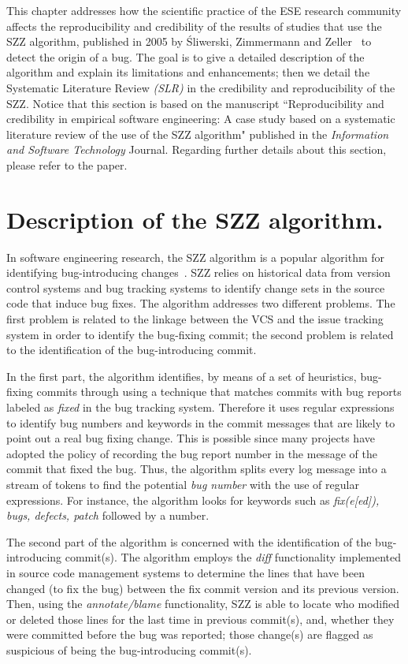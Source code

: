 \documentclass[a4paper, 12pt]{book}
\begin{document}
This chapter addresses how the scientific practice of the ESE research community affects the reproducibility and credibility of the results of studies that use the SZZ algorithm, published in 2005 by {\'S}liwerski, Zimmermann and Zeller~\cite{sliwerski2005changes}  to detect the origin of a bug. The goal is to give a detailed description of the algorithm and explain its limitations and enhancements; then we detail the Systematic Literature Review \emph{(SLR)} in the credibility and reproducibility of the SZZ. Notice that this section is based on the manuscript ``Reproducibility and credibility in empirical software engineering: A case study based on a systematic literature review of the use of the SZZ algorithm" published in the \emph{Information and Software Technology} Journal. Regarding further details about this section, please refer to the paper.


\section{Description of the SZZ algorithm.}
\label{subsec:SZZ algorithm}
In software engineering research, the SZZ algorithm is a popular algorithm for identifying bug-introducing changes~\cite{da2016framework}. SZZ relies on historical data from version control systems and bug tracking systems to identify change sets in the source code that induce bug fixes. The algorithm addresses two different problems. The first problem is related to the linkage between the VCS and the issue tracking system in order to identify the bug-fixing commit; the second problem is related to the identification of the bug-introducing commit.

In the first part, the algorithm identifies, by means of a set of heuristics, bug-fixing commits through using a technique that matches commits with bug reports labeled as \emph{fixed} in the bug tracking system. Therefore it uses regular expressions to identify bug numbers and keywords in the commit messages that are likely to point out a real bug fixing change. This is possible since many projects have adopted the policy of recording the bug report number in the message of the commit that fixed the bug. Thus, the algorithm splits every log message into a stream of tokens to find the potential \emph{bug number} with the use of regular expressions. For instance, the algorithm looks for keywords such as \emph{fix(e[ed]), bugs, defects, patch} followed by a number.

The second part of the algorithm is concerned with the identification of the bug-introducing commit(s). The algorithm employs the \textit{diff} functionality implemented in source code management systems to determine the lines that have been changed (to fix the bug) between the fix commit version and its previous version. Then, using the \textit{annotate/blame} functionality, SZZ is able to locate who modified or deleted those lines for the last time in previous commit(s), and, whether they were committed before the bug was reported; those change(s) are flagged as suspicious of being the bug-introducing commit(s).
\end{document}
